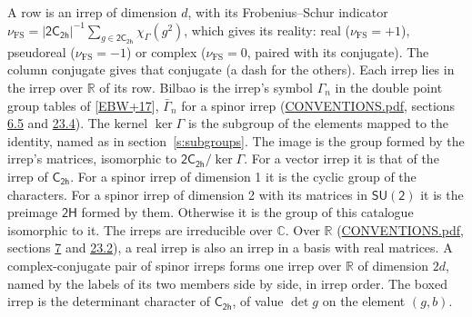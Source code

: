 \documentclass[10pt,a4paper]{article}
\numberwithin{equation}{section}
\newcommand{\grp}[1]{\mathsf{#1}}
\newcommand{\irchar}[1]{\chi_{#1}}
\newcommand{\fsind}{\nu_{\mathrm{FS}}}
\begin{document}
\leavevmode\label{n:index.frobenius}\label{n:head.irrep}\label{n:head.reality}A row is an irrep of dimension $d$, with its Frobenius--Schur indicator $\fsind = |\grp{2C_{2h}}|^{-1}\allowbreak\sum_{g\in\grp{2C_{2h}}}\irchar{\Gamma}(g^2)$, which gives its reality: real ($\fsind = +1$), pseudoreal ($\fsind = -1$) or complex ($\fsind = 0$, paired with its conjugate). \label{n:head.conjugate}The column conjugate gives that conjugate (a dash for the others). \label{n:head.over.real}Each irrep lies in the irrep over $\mathbb{R}$ of its row. \label{n:head.bilbao}\label{n:irrep.alias.gamma}Bilbao is the irrep's symbol $\Gamma_n$ in the double point group tables of [\href{../../../REFERENCES.pdf\#ref.EBW+17}{EBW+17}], $\bar{\Gamma}_n$ for a spinor irrep (\href{../../CONVENTIONS.pdf}{CONVENTIONS.pdf}, sections \href{../../../rotation/CONVENTIONS.pdf\#conv.6.5}{6.5} and \href{../../CONVENTIONS.pdf\#conv.23.4}{23.4}). \label{n:head.kernel}The kernel $\ker\Gamma$ is the subgroup of the elements mapped to the identity, named as in section~\ref{s:subgroups}. \label{n:head.image}The image is the group formed by the irrep's matrices, isomorphic to $\grp{2C_{2h}}/\ker\Gamma$. For a vector irrep it is that of the irrep of \href{../../../rotation/data/pdf/C2h.pdf}{$\grp{C_{2h}}$}. For a spinor irrep of dimension 1 it is the cyclic group of the characters. For a spinor irrep of dimension 2 with its matrices in $\grp{SU(2)}$ it is the preimage $\grp{2H}$ formed by them. Otherwise it is the group of this catalogue isomorphic to it. The irreps are irreducible over $\mathbb{C}$. Over $\mathbb{R}$ (\href{../../CONVENTIONS.pdf}{CONVENTIONS.pdf}, sections \href{../../../rotation/CONVENTIONS.pdf\#conv.7}{7} and \href{../../CONVENTIONS.pdf\#conv.23.2}{23.2}), a real irrep is also an irrep in a basis with real matrices. A complex-conjugate pair of spinor irreps forms one irrep over $\mathbb{R}$ of dimension $2d$, named by the labels of its two members side by side, in irrep order. \label{n:mark.determinant}The boxed irrep is the determinant character of \href{../../../rotation/data/pdf/C2h.pdf}{$\grp{C_{2h}}$}, of value $\det g$ on the element $(g, b)$.
\setlength{\emergencystretch}{2em}\par\setlength{\emergencystretch}{0pt}
\end{document}
